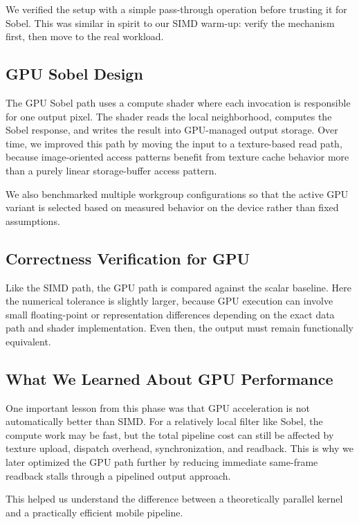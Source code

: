\documentclass[12pt,a4paper]{article}
\begin{document}
We verified the setup with a simple pass-through operation before trusting it for Sobel. This was similar in spirit to our SIMD warm-up: verify the mechanism first, then move to the real workload.

\subsection{GPU Sobel Design}

The GPU Sobel path uses a compute shader where each invocation is responsible for one output pixel. The shader reads the local neighborhood, computes the Sobel response, and writes the result into GPU-managed output storage. Over time, we improved this path by moving the input to a texture-based read path, because image-oriented access patterns benefit from texture cache behavior more than a purely linear storage-buffer access pattern.

We also benchmarked multiple workgroup configurations so that the active GPU variant is selected based on measured behavior on the device rather than fixed assumptions.

\subsection{Correctness Verification for GPU}

Like the SIMD path, the GPU path is compared against the scalar baseline. Here the numerical tolerance is slightly larger, because GPU execution can involve small floating-point or representation differences depending on the exact data path and shader implementation. Even then, the output must remain functionally equivalent.

\subsection{What We Learned About GPU Performance}

One important lesson from this phase was that GPU acceleration is not automatically better than SIMD. For a relatively local filter like Sobel, the compute work may be fast, but the total pipeline cost can still be affected by texture upload, dispatch overhead, synchronization, and readback. This is why we later optimized the GPU path further by reducing immediate same-frame readback stalls through a pipelined output approach.

This helped us understand the difference between a theoretically parallel kernel and a practically efficient mobile pipeline.
\end{document}
